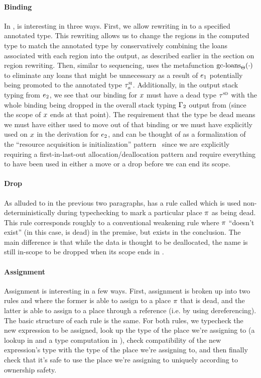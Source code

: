 \paragraph{Binding} In \lang,  is interesting in three ways.
First, we allow rewriting in  to a specified annotated type. This
rewriting allows us to change the regions in the computed type to match the
annotated type by conservatively combining the loans associated with each region
into the output, as described earlier in the section on region rewriting. Then,
similar to sequencing,  uses the metafunction
$\textrm{gc-loans}_{\Theta}(\cdot)$ to eliminate any loans that might be unnecessary
as a result of $e_1$ potentially being promoted to the annotated type
$\tau^\textsc{si}_a$. Additionally, in the output stack typing from $e_2$, we see
that our binding for $x$ must have a dead type $\tau^\textsc{sd}$ with the whole
binding being dropped in the overall stack typing $\Gamma_2$ output from
 (since the scope of $x$ ends at that point). The requirement
that the type be dead means we must have either used  to move out
of that binding or we must have explicitly used  on $x$ in
the derivation for $e_2$, and can be thought of as a formalization of the
``resource acquisition is initialization'' pattern~\cite{stroustrup94:raii}
since we are explicitly requiring a first-in-last-out allocation/deallocation
pattern and require everything to have been used in either a move or a drop
before we can end its scope.

\paragraph{Drop} As alluded to in the previous two paragraphs, \lang has a rule
called  which is used non-deterministically during typechecking
to mark a particular place $\pi$ as being dead. This rule corresponds
roughly to a conventional weakening rule where $\pi$ ``doesn't exist'' (in
this case, is dead) in the premise, but exists in the conclusion. The main
difference is that while the data is thought to be deallocated, the name is
still in-scope to be dropped when its scope ends in .

\paragraph{Assignment} Assignment is interesting in a few ways. First,
assignment is broken up into two rules  and
 where the former is able to assign to a place $\pi$
that is dead, and the latter is able to assign to a place through a reference
(i.e. by using dereferencing). The basic structure of each rule is the same. For
both rules, we typecheck the new expression to be assigned, look up the type of
the place we're assigning to (a lookup in  and a type
computation in ), check compatibility of the new
expression's type with the type of the place we're assigning to, and then
finally check that it's safe to use the place we're assigning to uniquely
according to ownership safety.


